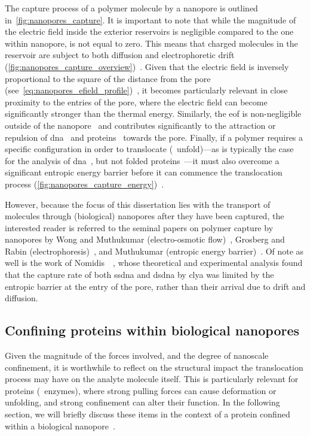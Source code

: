 The capture process of a polymer molecule by a nanopore is outlined in~\cref{fig:nanopores_capture}. It is
important to note that while the magnitude of the electric field inside the exterior reservoirs is negligible
compared to the one within nanopore, is not equal to zero. This means that charged molecules in the reservoir
are subject to both diffusion and electrophoretic drift
(\cref{fig:nanopores_capture_overview})~\cite{Muthukumar-2010}. Given that the electric field is inversely
proportional to the square of the distance from the pore
(see~\cref{eq:nanopores_efield_profile})~\cite{Grosberg-2010}, it becomes particularly relevant in close
proximity to the entries of the pore, where the electric field can become significantly stronger than the
thermal energy. Similarly, the \gls{eof} is non-negligible outside of the nanopore~\cite{Wong-2007} and
contributes significantly to the attraction or repulsion of \gls{dna}~\cite{Firnkes-2010} and
proteins~\cite{Soskine-2012,Soskine-2013} towards the pore. Finally, if a polymer requires a specific
configuration in order to translocate (\ie~unfold)---as is typically the case for the analysis of
\gls{dna}~\cite{Muthukumar-2010}, but not folded proteins~\cite{Yusko-2011,Soskine-2012,Plesa-2013}---it must
also overcome a significant entropic energy barrier before it can commence the translocation process
(\cref{fig:nanopores_capture_energy})~\cite{Muthukumar-2010}.

However, because the focus of this dissertation lies with the transport of molecules through (biological)
nanopores after they have been captured, the interested reader is referred to the seminal papers on polymer
capture by nanopores by Wong and Muthukumar (electro-osmotic flow)~\cite{Wong-2007}, Grosberg and Rabin
(electrophoresis)~\cite{Grosberg-2010}, and Muthukumar (entropic energy barrier)~\cite{Muthukumar-2010}. Of
note as well is the work of Nomidis~\etal~\cite{Nomidis-2018}, whose theoretical and experimental analysis
found that the capture rate of both \gls{ssdna} and \gls{dsdna} by \gls{clya} was limited by the entropic
barrier at the entry of the pore, rather than their arrival due to drift and diffusion.


\subsection{Confining proteins within biological nanopores}
%
\label{sec:np:confinement}
%

Given the magnitude of the forces involved, and the degree of nanoscale confinement, it is worthwhile to
reflect on the structural impact the translocation process may have on the analyte molecule itself. This is
particularly relevant for proteins (\eg~enzymes), where strong pulling forces can cause deformation or
unfolding, and strong confinement can alter their function. In the following section, we will briefly discuss
these items in the context of a protein confined within a biological nanopore~\cite{Galenkamp-2020}.


